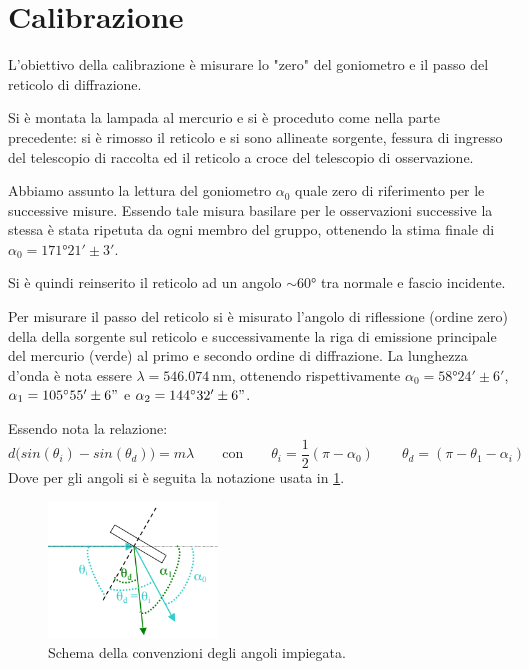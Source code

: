 \section{Calibrazione}
	L'obiettivo della calibrazione è misurare lo "zero" del goniometro e il passo del reticolo di diffrazione.
	
	Si è montata la lampada al mercurio e si è proceduto come nella parte precedente:
	si è rimosso il reticolo e si sono allineate sorgente, fessura di ingresso del telescopio di raccolta
	ed il reticolo a croce del telescopio di osservazione.
	
	Abbiamo assunto la lettura del goniometro
	$\alpha_0$ quale zero di riferimento per le successive misure.
	Essendo tale misura basilare per le osservazioni successive la stessa è stata ripetuta da ogni membro del gruppo,
	ottenendo la stima finale di $\alpha_0 = \ang{171;21; } \pm 3' $.
	
	Si è quindi reinserito il reticolo ad un angolo $\sim \ang{60}$
	tra normale e fascio incidente.

	Per misurare il passo del reticolo si è misurato l'angolo di riflessione (ordine zero) della della sorgente sul reticolo e successivamente la riga di emissione principale del mercurio (verde) al 
	primo e secondo ordine di diffrazione. La lunghezza d'onda è nota essere $\lambda = \SI{546.074}{\nano\meter}$,
	ottenendo rispettivamente $\alpha_0=\ang{58;24;} \pm 6'$, $\alpha_1=\ang{105;55;}\pm 6"$ e $\alpha_2=\ang{144;32;}\pm 6"$.
	
	Essendo nota la relazione:
	\smallskip
	\begin{equation*}
	d\bigl(sin (\theta_i) - sin (\theta_d)\bigr) = m \lambda\qquad \text{con}\qquad \theta_i=\frac{1}{2}(\pi- \alpha_0)\qquad \theta_d=(\pi- \theta_1-\alpha_i)
	\end{equation*}
	Dove per gli angoli si è seguita la notazione usata in \figurename{ \ref{fig:angoli}}.
	\bigskip
	\begin{figure} [H]
		\centering
		\includegraphics[width=0.4\textwidth]{../FIgs-tabs/angoli.png}
		\caption{Schema della convenzioni degli angoli impiegata.}
		\label{fig:angoli}
	\end{figure}
	\smallskip

